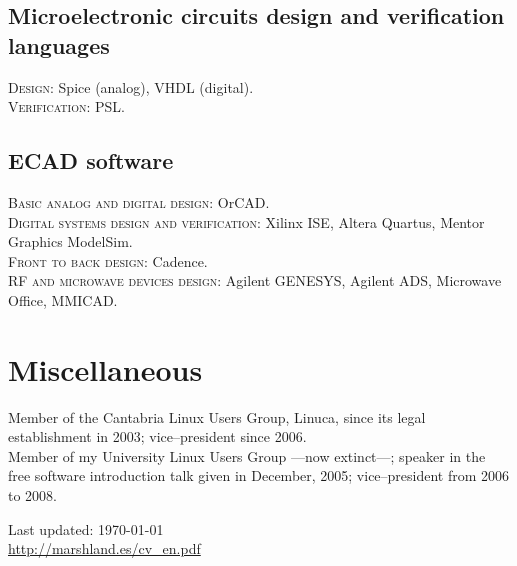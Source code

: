 \documentclass[11pt, a4paper]{article}
\begin{document}
\subsection*{Microelectronic circuits design and verification languages}
\noindent
	\textsc{Design}: Spice (analog), VHDL (digital).\\
	\textsc{Verification}: PSL.
\subsection*{ECAD software}
\noindent
	\textsc{Basic analog and digital design}: OrCAD.\\
	\textsc{Digital systems design and verification}: Xilinx ISE, Altera Quartus, Mentor Graphics ModelSim.\\
	\textsc{Front to back design}: Cadence.\\
	\textsc{RF and microwave devices design}: Agilent GENESYS, Agilent ADS, Microwave Office, MMICAD.


\section*{Miscellaneous} %
\noindent
Member of the Cantabria Linux Users Group, Linuca, since its legal establishment in 2003; vice--president since 2006.\\
Member of my University Linux Users Group ---now extinct---; speaker in the free software introduction talk given in December, 2005; vice--president from 2006 to 2008.


\vfill{}
\hrulefill


\begin{center}
{\scriptsize
	Last updated: \today \\
	\href{http://marshland.es/cv_en.pdf}
	     {http://marshland.es/cv\_en.pdf}
}
\end{center}
\end{document}
